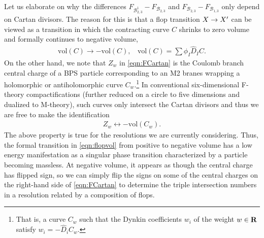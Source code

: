 \documentclass[11pt,oneside,english]{article}
\numberwithin{equation}{section}
\renewcommand*{\to}{\mathchoice{\longrightarrow}{\rightarrow}{\rightarrow}{\rightarrow}}
\theoremstyle{definition}
\begin{document}
Let us elaborate on why the differences $ F_{\mathscr B_{2,3}^1} -  F_{\mathscr B_{2,3}}$ and $ F_{\mathscr B_{2,3}} -  F_{\mathscr B_{1,3}}$ only depend on Cartan divisors. The reason for this is that a flop transition $X \to X'$ can be viewed as a transition in which the contracting curve $C$ shrinks to zero volume and formally continues to negative volume, 
	\begin{align}
	\label{eqn:flopvol}
		\text{vol}(C) \rightarrow - \text{vol}(C),~~~~ \text{vol}(C) =\sum \phi_I \hat D_I  C.
	\end{align}
On the other hand, we note that $Z_w$ in \cref{eqn:FCartan} is the Coulomb branch central charge of a BPS particle corresponding to an M2 branes wrapping a holomorphic or antiholomorphic curve $C_w$.\footnote{That is, a curve $C_w$ such that the Dynkin coefficients $w_i$ of the weight $w \in \textbf R$ satisfy $w_i =- \hat D_i  C_w$.} In conventional six-dimensional F-theory compactifications (further reduced on a circle to five dimensions and dualized to M-theory), such curves only intersect the Cartan divisors and thus we are free to make the identification \cite{Intriligator:1997pq}
	\begin{align}
		Z_w \longleftrightarrow -\text{vol}(C_{w}).
	\end{align} 
The above property is true for the resolutions we are currently considering. Thus, the formal transition in \cref{eqn:flopvol} from positive to negative volume has a low energy manifestation as a singular phase transition characterized by a particle becoming massless. At negative volume, it appears as though the central charge has flipped sign, so we can simply flip the signs on some of the central charges on the right-hand side of \cref{eqn:FCartan} to determine the triple intersection numbers in a resolution related by a composition of flops. 
\end{document}
